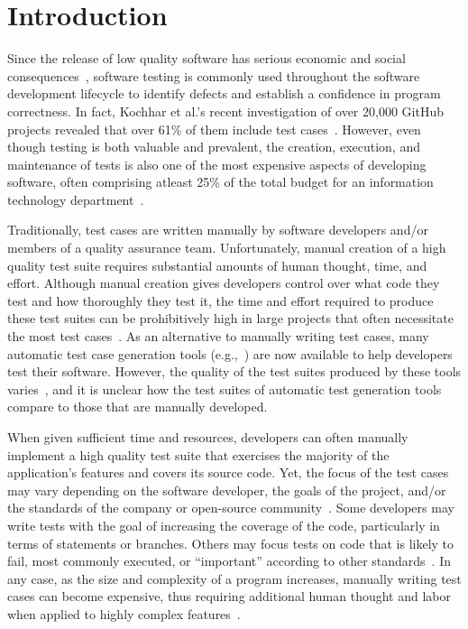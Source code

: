 
\section{Introduction}


Since the release of low quality software has serious economic and social consequences~\cite{tassey2002}, software testing is commonly used throughout the software development lifecycle to identify defects and establish a confidence in program correctness. In fact, Kochhar et al.'s recent investigation of over 20,000 GitHub projects revealed that over 61\% of them include test cases~\cite{kochhar2013}.  However, even though testing is both valuable and prevalent, the creation, execution, and maintenance of tests is also one of the most expensive aspects of developing software, often comprising atleast 25\% of the total budget for an information technology department~\cite{vizard2013}.  


Traditionally, test cases are written manually by software developers and/or members of a quality assurance team.  Unfortunately, manual creation of a high quality test suite requires substantial amounts of human thought, time, and effort.  Although manual creation gives developers control over what code they test and how thoroughly they test it, the time and effort required to produce these test suites can be prohibitively high in large projects that often necessitate the most test cases~\cite{kochhar2013}.  As an alternative to manually writing test cases, many automatic test case generation tools (e.g.,~\cite{fraser:2011:eat:2025113.2025179,pacheco2007feedback,csallner2004}) are now available to help developers test their software.  However, the quality of the test suites produced by these tools varies~\cite{bacchelli2008,fraser2013c,fraser2013a}, and it is unclear how the test suites of automatic test generation tools compare to those that are manually developed.


When given sufficient time and resources, developers can often manually implement a high quality test suite that exercises the majority of the application's features and covers its source code.  Yet, the focus of the test cases may vary depending on the software developer, the goals of the project, and/or the standards of the company or open-source community~\cite{kochhar2013}.  Some developers may write tests with the goal of increasing the coverage of the code, particularly in terms of statements or branches.  Others may focus tests on code that is likely to fail, most commonly executed, or ``important'' according to other standards~\cite{mockus2009}. In any case, as the size and complexity of a program increases, manually writing test cases can become expensive, thus requiring additional human thought and labor when applied to highly complex features~\cite{clarke1998automated}.

